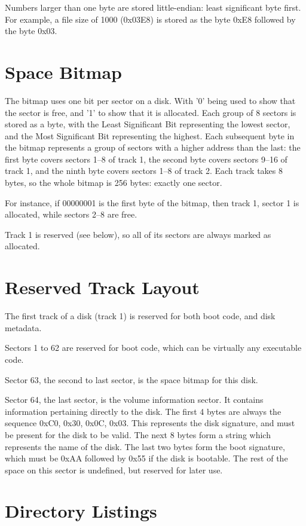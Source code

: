 \documentclass{article}
\begin{document}
Numbers larger than one byte are stored little-endian: least significant byte first. For example, a file size of 1000
(0x03E8) is stored as the byte 0xE8 followed by the byte 0x03.

\section{Space Bitmap}

The bitmap uses one bit per sector on a disk. With '0' being used to show that the sector is free, and '1' to show that it is allocated.
Each group of 8 sectors is stored as a byte, with the Least Significant Bit representing the lowest sector,
and the Most Significant Bit representing the highest. Each subsequent byte in the bitmap represents a group of sectors
with a higher address than the last: the first byte covers sectors 1--8 of track 1, the second byte covers sectors 9--16 of track 1,
and the ninth byte covers sectors 1--8 of track 2. Each track takes 8 bytes, so the whole bitmap is 256 bytes: exactly one sector.

For instance, if 00000001 is the first byte of the bitmap, then track 1, sector 1 is allocated, while sectors 2--8 are free.

Track 1 is reserved (see below), so all of its sectors are always marked as allocated.

\section{Reserved Track Layout}

The first track of a disk (track 1) is reserved for both boot code, and disk metadata.

Sectors 1 to 62 are reserved for boot code, which can be virtually any executable code.

Sector 63, the second to last sector, is the space bitmap for this disk.

Sector 64, the last sector, is the volume information sector. It contains information pertaining directly to the disk. The first 4 bytes are always the sequence 0xC0, 0x30, 0x0C, 0x03. This represents the disk
signature, and must be present for the disk to be valid. The next 8 bytes form a string which represents the name of the disk. The last two bytes form the boot signature,
which must be 0xAA followed by 0x55 if the disk is bootable. The rest of the space on this sector is undefined, but reserved for later use.

\section{Directory Listings}
\end{document}
